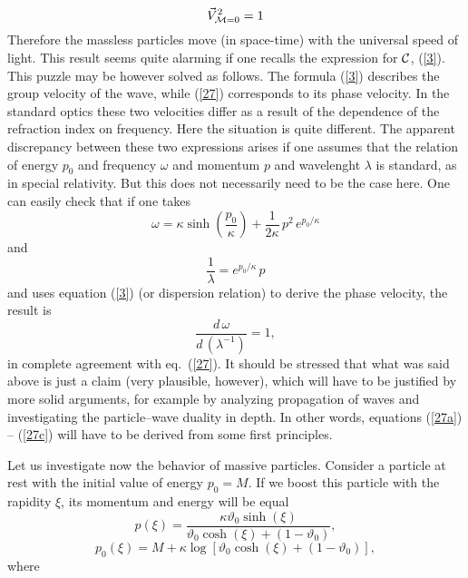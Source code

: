 \documentclass[a4paper,a4paper]{article}
\begin{document}
\begin{equation}\label{27}
 \vec{V}_{{\cal M}=0}^2 =1
\end{equation}
 Therefore the massless particles move (in space-time) with the universal speed of light. This result seems quite alarming if one recalls the expression for ${\cal C}$, (\ref{3}). This puzzle may be however solved as follows. The formula (\ref{3}) describes the group velocity of the wave, while (\ref{27}) corresponds to its phase velocity. In the standard optics these two velocities differ as a result of the dependence of the refraction index on frequency. Here the situation is quite different. The apparent discrepancy between these two expressions arises if one assumes that the relation of energy $p_0$ and frequency $\omega$ and momentum $p$ and wavelenght $\lambda$ is standard, as in special relativity. But this does not necessarily need to be  the case here. One can easily check that if one takes
\begin{equation}\label{27a}
  \omega = \kappa\sinh\left(\frac{p_0}\kappa\right) + \frac{1}{2\kappa}\, p^2 \, e^{p_0/\kappa}
\end{equation}
and
\begin{equation}\label{27b}
 \frac1\lambda = e^{p_0/\kappa}\, p
\end{equation}
and uses equation (\ref{3}) (or dispersion relation) to derive the phase velocity, the result is
\begin{equation}\label{27c}
  \frac{d\, \omega}{d\, (\lambda^{-1})} =1,
\end{equation}
in complete agreement with eq.~(\ref{27}). It should be stressed  that what was said above is just a  claim (very plausible, however), which will have to be justified by more solid arguments, for example by analyzing propagation of waves and investigating the particle--wave duality in depth. In other words, equations (\ref{27a}) -- (\ref{27c}) will have to be derived from some first principles.
 \newline
 
 Let us investigate now the behavior of massive particles. Consider a particle at rest with the initial value of energy $p_0=M$. If we boost this particle with the rapidity $\xi$, its momentum and energy will be equal \cite{rbgacjkg}
\begin{equation}\label{28}
  p(\xi) = \frac{\kappa\vartheta_0\sinh(\xi)}{\vartheta_0\cosh(\xi) +(1-\vartheta_0)},
\end{equation}
\begin{equation}\label{29}
  p_0(\xi) = M + \kappa\log\left[\vartheta_0\cosh(\xi) +(1-\vartheta_0)\right],
\end{equation}
where
\end{document}
